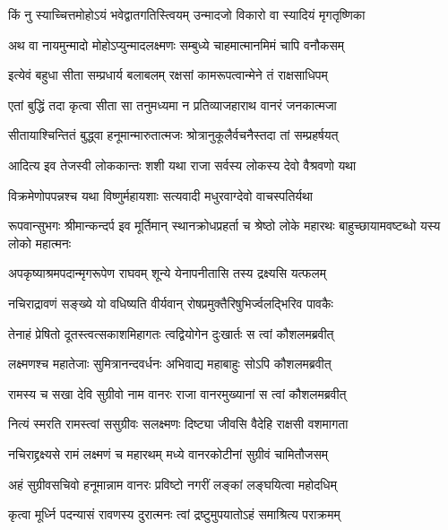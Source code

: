 \twolineshloka
{किं नु स्याच्चित्तमोहोऽयं भवेद्वातगतिस्त्वियम्}
{उन्मादजो विकारो वा स्यादियं मृगतृष्णिका} %

\twolineshloka
{अथ वा नायमुन्मादो मोहोऽप्युन्मादलक्ष्मणः}
{सम्बुध्ये चाहमात्मानमिमं चापि वनौकसम्} %

\twolineshloka
{इत्येवं बहुधा सीता सम्प्रधार्य बलाबलम्}
{रक्षसां कामरूपत्वान्मेने तं राक्षसाधिपम्} %

\twolineshloka
{एतां बुद्धिं तदा कृत्वा सीता सा तनुमध्यमा}
{न प्रतिव्याजहाराथ वानरं जनकात्मजा} %

\twolineshloka
{सीतायाश्चिन्तितं बुद्ध्वा हनूमान्मारुतात्मजः}
{श्रोत्रानुकूलैर्वचनैस्तदा तां सम्प्रहर्षयत्} %

\twolineshloka
{आदित्य इव तेजस्वी लोककान्तः शशी यथा}
{राजा सर्वस्य लोकस्य देवो वैश्रवणो यथा} %

\twolineshloka
{विक्रमेणोपपन्नश्च यथा विष्णुर्महायशाः}
{सत्यवादी मधुरवाग्देवो वाचस्पतिर्यथा} %

\threelineshloka
{रूपवान्सुभगः श्रीमान्कन्दर्प इव मूर्तिमान्}
{स्थानक्रोधप्रहर्ता च श्रेष्ठो लोके महारथः}
{बाहुच्छायामवष्टब्धो यस्य लोको महात्मनः} %

\twolineshloka
{अपकृष्याश्रमपदान्मृगरूपेण राघवम्}
{शून्ये येनापनीतासि तस्य द्रक्ष्यसि यत्फलम्} %

\twolineshloka
{नचिराद्रावणं सङ्ख्ये यो वधिष्यति वीर्यवान्}
{रोषप्रमुक्तैरिषुभिर्ज्वलद्भिरिव पावकैः} %

\twolineshloka
{तेनाहं प्रेषितो दूतस्त्वत्सकाशमिहागतः}
{त्वद्वियोगेन दुःखार्तः स त्वां कौशलमब्रवीत्} %

\twolineshloka
{लक्ष्मणश्च महातेजाः सुमित्रानन्दवर्धनः}
{अभिवाद्य महाबाहुः सोऽपि कौशलमब्रवीत्} %

\twolineshloka
{रामस्य च सखा देवि सुग्रीवो नाम वानरः}
{राजा वानरमुख्यानां स त्वां कौशलमब्रवीत्} %

\twolineshloka
{नित्यं स्मरति रामस्त्वां ससुग्रीवः सलक्ष्मणः}
{दिष्ट्या जीवसि वैदेहि राक्षसी वशमागता} %

\twolineshloka
{नचिराद्द्रक्ष्यसे रामं लक्ष्मणं च महारथम्}
{मध्ये वानरकोटीनां सुग्रीवं चामितौजसम्} %

\twolineshloka
{अहं सुग्रीवसचिवो हनूमान्नाम वानरः}
{प्रविष्टो नगरीं लङ्कां लङ्घयित्वा महोदधिम्} %

\twolineshloka
{कृत्वा मूर्ध्नि पदन्यासं रावणस्य दुरात्मनः}
{त्वां द्रष्टुमुपयातोऽहं समाश्रित्य पराक्रमम्} %

